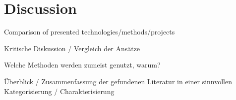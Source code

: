 \chapter{Discussion}
\label{ch:discussion}

Comparison of presented technologies/methods/projects

Kritische Diskussion / Vergleich der Ansätze

Welche Methoden werden zumeist genutzt, warum?

Überblick / Zusammenfassung der gefundenen Literatur in einer sinnvollen Kategorisierung / Charakterisierung
